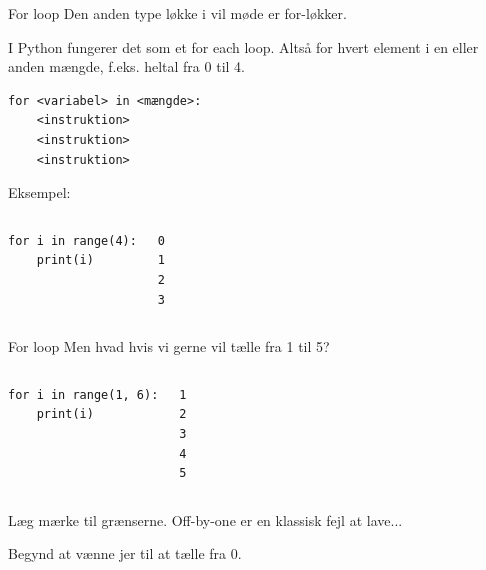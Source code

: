 
\begin{frame}[fragile]{For loop}
	Den anden type løkke i vil møde er for-løkker.
	
	I Python fungerer det som et for each loop. Altså for hvert element i en eller anden mængde, f.eks. heltal fra 0 til 4.
	\begin{lstlisting}[style=python]
for <variabel> in <mængde>:
	<instruktion>
	<instruktion>
	<instruktion>
	\end{lstlisting}
	\pause
	Eksempel:
	\begin{columns}
		\begin{lstlisting}[style=python]
for i in range(4):
	print(i)
		\end{lstlisting}
		\begin{lstlisting}[style=python]
0
1
2
3
		\end{lstlisting}
	\end{columns}
\end{frame}


\begin{frame}[fragile]{For loop}
	Men hvad hvis vi gerne vil tælle fra 1 til 5?
	\pause
	\begin{columns}
		\column{0.4\textwidth}
		\begin{lstlisting}[style=python]
for i in range(1, 6):
	print(i)
		\end{lstlisting}
		\column{0.4\textwidth}
				\begin{lstlisting}[style=python]
1
2
3
4
5
		\end{lstlisting}
	\end{columns}
	Læg mærke til grænserne. Off-by-one er en klassisk fejl at lave...
	
	Begynd at vænne jer til at tælle fra 0.
\end{frame}

